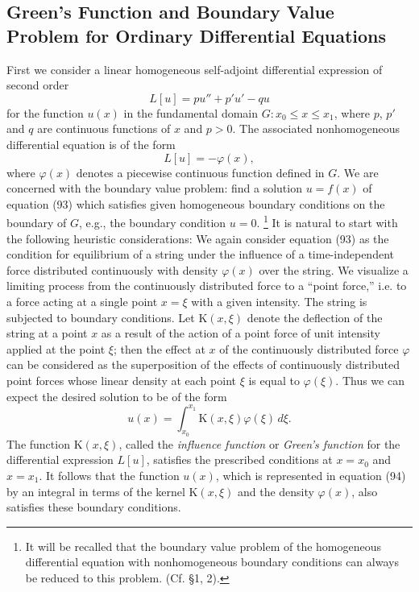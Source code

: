 \subsection{Green's Function and Boundary Value Problem for Ordinary Differential Equations}
First we consider a linear homogeneous self-adjoint differential expression of second order
\[
L[u]=pu''+p'u'-qu
\]
for the function $u(x)$ in the fundamental domain $G:x_0\le x\le x_1$, where $p$, $p'$ and $q$ are continuous functions of $x$ and $p>0$. The associated nonhomogeneous differential equation is of the form
\begin{equation}
L[u]=-\varphi(x),
\tag{93}
\end{equation}
where $\varphi(x)$ denotes a piecewise continuous function defined in $G$. We are concerned with the boundary value problem: find a solution $u=f(x)$ of equation (93) which satisfies given homogeneous boundary conditions on the boundary of $G$, e.g., the boundary condition $u=0$.
\footnote{It will be recalled that the boundary value problem of the homogeneous differential equation with nonhomogeneous boundary conditions can always be reduced to this problem. (Cf. \S1, 2).}
It is natural to start with the following heuristic considerations: We again consider equation (93) as the condition for equilibrium of a string under the influence of a time-independent force distributed continuously with density $\varphi(x)$ over the string. We visualize a limiting process from the continuously distributed force to a ``point force,'' i.e. to a force acting at a single point $x=\xi$ with a given intensity. The string is subjected to boundary conditions. Let $\mathrm K(x,\xi)$ denote the deflection of the string at a point $x$ as a result of the action of a point force of unit intensity applied at the point $\xi$; then the effect at $x$ of the continuously distributed force $\varphi$ can be considered as the superposition of the effects of continuously distributed point forces whose linear density at each point $\xi$ is equal to $\varphi(\xi)$. Thus we can expect the desired solution to be of the form
\begin{equation}
u(x)=\int_{x_0}^{x_1}\mathrm K(x,\xi)\varphi(\xi)\,d\xi.
\tag{94}
\end{equation}
The function $\mathrm K(x,\xi)$, called the \emph{influence function} or \emph{Green's function} for the differential expression $L[u]$, satisfies the prescribed conditions at $x=x_0$ and $x=x_1$. It follows that the function $u(x)$, which is represented in equation (94) by an integral in terms of the kernel $\mathrm K(x,\xi)$ and the density $\varphi(x)$, also satisfies these boundary conditions.

